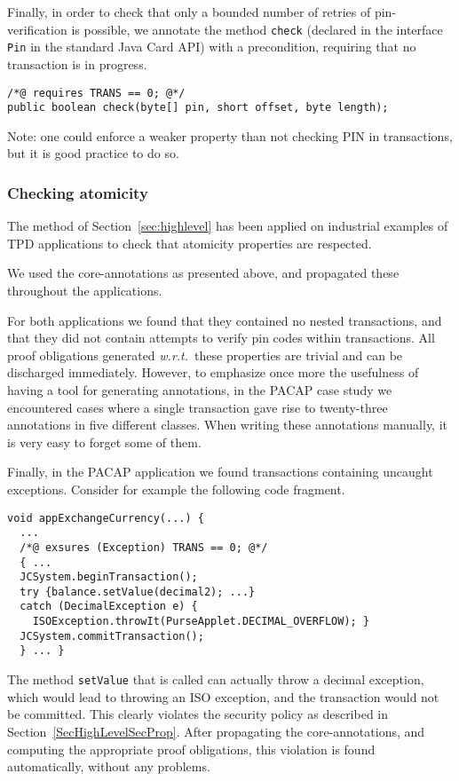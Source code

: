 Finally, in order to check that only a bounded number of retries of
pin-verification is possible, we annotate the method \texttt{check}
(declared in the interface \texttt{Pin} in the
standard Java Card API) with a precondition, requiring that no
transaction is in progress.
\begin{verbatim}
/*@ requires TRANS == 0; @*/
public boolean check(byte[] pin, short offset, byte length);
\end{verbatim}
Note: one could enforce a weaker property than not checking
PIN in transactions, but it is good practice to do so.

\subsubsection{Checking atomicity}
The method of Section~\ref{sec:highlevel} has been applied on
industrial examples of TPD applications to check that atomicity
properties are respected.



 We used the core-annotations as presented above, and
propagated these throughout the applications.

For both applications we found that they contained no nested
transactions, and that they did not contain attempts to verify pin
codes within transactions. All proof obligations generated
\emph{w.r.t.}~these properties are trivial and can be discharged
immediately. However, to emphasize once more the usefulness of having
a tool for generating annotations, in the PACAP case study we
encountered cases where a single transaction gave rise to twenty-three
annotations in five different classes. When writing these annotations
manually, it is very easy to forget some of them.

Finally, in the PACAP application we found transactions containing
uncaught exceptions. Consider for example the following code fragment.
\begin{verbatim}
void appExchangeCurrency(...) { 
  ...
  /*@ exsures (Exception) TRANS == 0; @*/ 
  { ...
  JCSystem.beginTransaction();      
  try {balance.setValue(decimal2); ...}
  catch (DecimalException e) {
    ISOException.throwIt(PurseApplet.DECIMAL_OVERFLOW); }
  JCSystem.commitTransaction();
  } ... }
\end{verbatim}
The method \texttt{setValue} that is called can actually throw a
decimal exception, which would lead to throwing an ISO exception, and
the transaction would not be committed. This clearly violates the
security policy as described in
Section~\ref{SecHighLevelSecProp}. After propagating the
core-annotations, and computing the appropriate proof obligations,
this violation is found automatically, without any problems.




